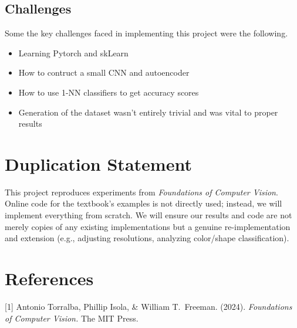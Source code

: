 \documentclass{article}
\begin{document}
\subsection{Challenges}
Some the key challenges faced in implementing this project were the following.
\begin{itemize}
    \item Learning Pytorch and skLearn
    \item How to contruct a small CNN and autoencoder
    \item How to use 1-NN classifiers to get accuracy scores
    \item Generation of the dataset wasn't entirely trivial and was vital to proper results
\end{itemize}
\section{Duplication Statement}
This project reproduces experiments from \textit{Foundations of Computer Vision}. Online code for the textbook’s examples is not directly used; instead, we will implement everything from scratch. We will ensure our results and code are not merely copies of any existing implementations but a genuine re-implementation and extension (e.g., adjusting resolutions, analyzing color/shape classification). 
\newpage
\section*{References}
\medskip
{
\small
[1] Antonio Torralba, Phillip Isola, \& William T.\ Freeman. (2024). \textit{Foundations of Computer Vision.} The MIT Press. 
}
\end{document}
